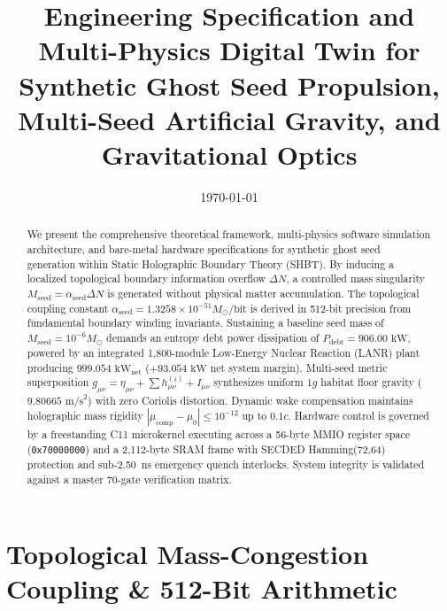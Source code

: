 \documentclass[twocolumn,aps,pra,floatfix,superscriptaddress,10pt]{revtex4-2}
\begin{document}
\title{Engineering Specification and Multi-Physics Digital Twin for Synthetic Ghost Seed Propulsion, Multi-Seed Artificial Gravity, and Gravitational Optics}


\date{\today}

\begin{abstract}
We present the comprehensive theoretical framework, multi-physics software simulation architecture, and bare-metal hardware specifications for synthetic ghost seed generation within Static Holographic Boundary Theory (SHBT). By inducing a localized topological boundary information overflow $\Delta N$, a controlled mass singularity $M_{\text{seed}} = \alpha_{\text{seed}} \Delta N$ is generated without physical matter accumulation. The topological coupling constant $\alpha_{\text{seed}} = 1.3258 \times 10^{-51} M_\odot/\text{bit}$ is derived in 512-bit precision from fundamental boundary winding invariants. Sustaining a baseline seed mass of $M_{\text{seed}} = 10^{-6} M_\odot$ demands an entropy debt power dissipation of $P_{\text{debt}} = 906.00\text{ kW}$, powered by an integrated 1,800-module Low-Energy Nuclear Reaction (LANR) plant producing $999.054\text{ kW}_{\text{net}}$ ($+93.054\text{ kW}$ net system margin). Multi-seed metric superposition $g_{\mu\nu} = \eta_{\mu\nu} + \sum h_{\mu\nu}^{(i)} + I_{\mu\nu}$ synthesizes uniform $1g$ habitat floor gravity ($9.80665\text{ m/s}^2$) with zero Coriolis distortion. Dynamic wake compensation maintains holographic mass rigidity $|\mu_{\text{comp}} - \mu_0| \le 10^{-12}$ up to $0.1c$. Hardware control is governed by a freestanding C11 microkernel executing across a 56-byte MMIO register space (\texttt{0x70000000}) and a 2,112-byte SRAM frame with SECDED Hamming(72,64) protection and sub-2.50~ns emergency quench interlocks. System integrity is validated against a master 70-gate verification matrix.
\end{abstract}

\maketitle

\section{Topological Mass-Congestion Coupling \& 512-Bit Arithmetic}
\end{document}
